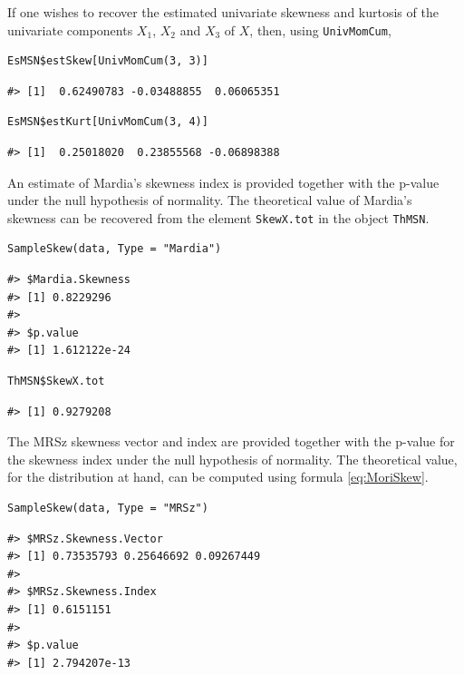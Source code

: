 If one wishes to recover the estimated univariate skewness and kurtosis of the univariate components \(X_1\), \(X_2\) and \(X_3\) of \(X\), then, using \texttt{UnivMomCum},

\begin{verbatim}
EsMSN$estSkew[UnivMomCum(3, 3)]
\end{verbatim}

\begin{verbatim}
#> [1]  0.62490783 -0.03488855  0.06065351
\end{verbatim}

\begin{verbatim}
EsMSN$estKurt[UnivMomCum(3, 4)] 
\end{verbatim}

\begin{verbatim}
#> [1]  0.25018020  0.23855568 -0.06898388
\end{verbatim}

An estimate of Mardia's skewness index is provided together with the p-value under the null hypothesis of normality. The theoretical value of Mardia's skewness can be recovered from the element \texttt{SkewX.tot} in the object \texttt{ThMSN}.

\begin{verbatim}
SampleSkew(data, Type = "Mardia")
\end{verbatim}

\begin{verbatim}
#> $Mardia.Skewness
#> [1] 0.8229296
#> 
#> $p.value
#> [1] 1.612122e-24
\end{verbatim}

\begin{verbatim}
ThMSN$SkewX.tot
\end{verbatim}

\begin{verbatim}
#> [1] 0.9279208
\end{verbatim}

The MRSz skewness vector and index are provided together with the p-value for the skewness index under the null hypothesis of normality. The theoretical value, for the distribution at hand, can be computed using formula \eqref{eq:MoriSkew}.

\begin{verbatim}
SampleSkew(data, Type = "MRSz")
\end{verbatim}

\begin{verbatim}
#> $MRSz.Skewness.Vector
#> [1] 0.73535793 0.25646692 0.09267449
#> 
#> $MRSz.Skewness.Index
#> [1] 0.6151151
#> 
#> $p.value
#> [1] 2.794207e-13
\end{verbatim}

